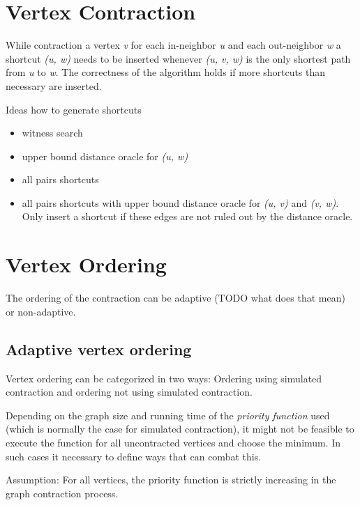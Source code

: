 \section{Vertex Contraction}

While contraction a vertex \emph{v} for each in-neighbor \emph{u} and each out-neighbor \emph{w} a shortcut \emph{(u, w)} needs to be inserted whenever \emph{(u, v, w)} is the only shortest path from \emph{u} to \emph{w}.
The correctness of the algorithm holds if more shortcuts than necessary are inserted.

Ideas how to generate shortcuts
\begin{itemize}
      \item
            witness  search

      \item
            upper bound distance oracle for \emph{(u, w)}

      \item
            all pairs shortcuts

      \item
            all pairs shortcuts with upper bound distance oracle for \emph{(u, v)} and \emph{(v, w)}.
            Only insert a shortcut if these edges are not ruled out by the distance oracle.

\end{itemize}

\section{Vertex Ordering}
The ordering of the contraction can be adaptive (TODO what does that mean) or non-adaptive.

\subsection{Adaptive vertex ordering}
Vertex ordering can be categorized in two ways: Ordering using simulated contraction and ordering not using simulated contraction.

Depending on the graph size and running time of the \emph{priority function} used (which is normally the case for simulated contraction), it might not be feasible to execute the function for all uncontracted vertices and choose the minimum.
In such cases it necessary to define ways that can combat this.

Assumption: For all vertices, the priority function is strictly increasing in the graph contraction process.

